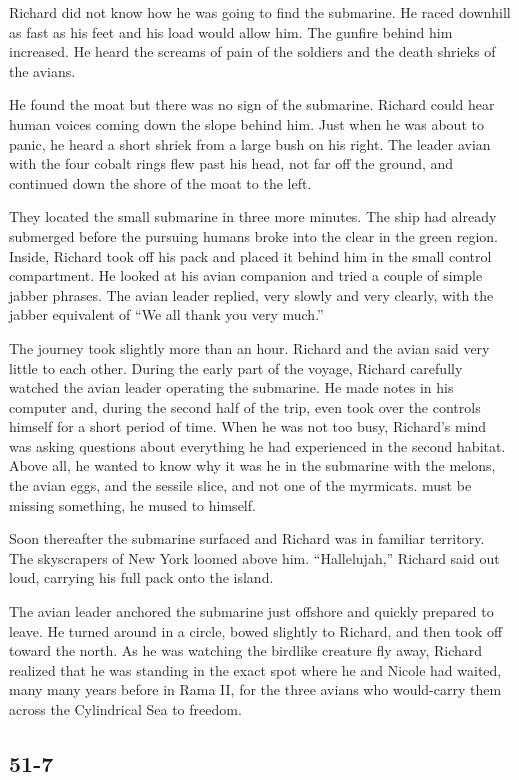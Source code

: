 \documentclass[]{article}
\begin{document}
{{Richard did not know how he was going to find the submarine.  He raced downhill as fast as his feet and his load would allow him.  The gunfire behind him increased.  He heard the screams of pain of the soldiers and the death shrieks of the avians.

He found the moat but there was no sign of the submarine.  Richard could hear human voices coming down the slope behind him.  Just when he was about to panic, he heard a short shriek from a large bush on his right.  The leader avian with the four cobalt rings flew past his head, not far off the ground, and continued down the shore of the moat to the left.

They located the small submarine in three more minutes.  The ship had already submerged before the pursuing humans broke into the clear in the green region.  Inside, Richard took off his pack and placed it behind him in the small control compartment.  He looked at his avian companion and tried a couple of simple jabber phrases.  The avian leader replied, very slowly and very clearly, with the jabber equivalent of “We all thank you very much.”

The journey took slightly more than an hour.  Richard and the avian said very little to each other.  During the early part of the voyage, Richard carefully watched the avian leader operating the submarine.  He made notes in his computer and, during the second half of the trip, even took over the controls himself for a short period of time.  When he was not too busy, Richard’s mind was asking questions about everything he had experienced in the second habitat.  Above all, he wanted to know why it was he in the submarine with the melons, the avian eggs, and the sessile slice, and not one of the myrmicats.  must be missing something, he mused to himself.

Soon thereafter the submarine surfaced and Richard was in familiar territory.  The skyscrapers of New York loomed above him.  “Hallelujah,” Richard said out loud, carrying his full pack onto the island.

The avian leader anchored the submarine just offshore and quickly prepared to leave.  He turned around in a circle, bowed slightly to Richard, and then took off toward the north.  As he was watching the birdlike creature fly away, Richard realized that he was standing in the exact spot where he and Nicole had waited, many many years before in Rama II, for the three avians who would-carry them across the Cylindrical Sea to freedom.


\subsection*{51-7}

}}
\end{document}

